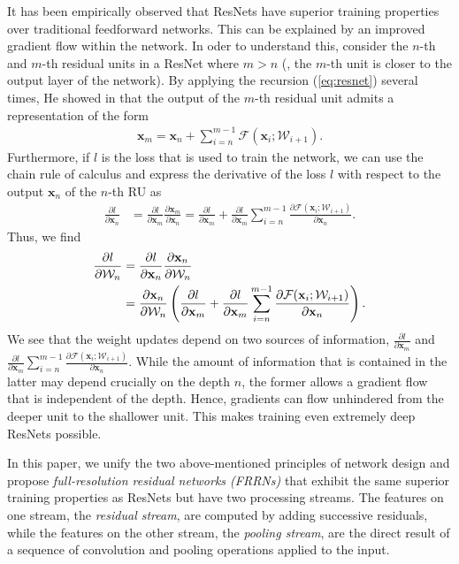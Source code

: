 \documentclass[10pt,twocolumn,letterpaper]{article}
\newcommand{\bx}{\mathbf{x}}
\newcommand{\PAR}[1]{\vskip4pt \noindent {\bf #1~}}
\begin{document}
It has been empirically observed that ResNets have superior training properties over traditional feedforward networks.
This can be explained by an improved gradient flow within the network.
In oder to understand this, consider the $n$-th and $m$-th residual units in a ResNet where $m > n$ (\ie, the $m$-th unit is closer to the output layer of the network).
By applying the recursion (\ref{eq:resnet}) several times, He \etal showed in  \cite{He16ECCV} that the output of the $m$-th residual unit admits a representation of the form
\begin{align}
	\bx_m = \bx_n + \sum_{i = n}^{m - 1} \mathcal{F}(\bx_i; \mathcal{W}_{i+1}).
\end{align}
Furthermore, if $l$ is the loss that is used to train the network, we can use the chain rule of calculus and express the derivative of the loss $l$ with respect to the output $\bx_n$ of the $n$-th RU as
\begin{align}
	\frac{\partial l}{\partial \bx_n} &= \frac{\partial l}{\partial \bx_m} \frac{\partial \bx_m}{\partial \bx_n} = \frac{\partial l}{\partial \bx_m} + \frac{\partial l}{\partial \bx_m} \sum_{i = n}^{m - 1} \frac{\partial \mathcal{F}(\bx_i; \mathcal{W}_{i+1})}{\partial \bx_n}.
\end{align}
Thus, we find
\begin{align}
	\frac{\partial l}{\partial \mathcal{W}_{n}} &= \frac{\partial l}{\partial \bx_n} \frac{\partial \bx_n}{\partial \mathcal{W}_{n}} \notag \\
	&= \frac{\partial \bx_n}{\partial \mathcal{W}_{n}} \left( \frac{\partial l}{\partial \bx_m} + \frac{\partial l}{\partial \bx_m} \sum_{i = n}^{m - 1} \frac{\partial \mathcal{F}(\bx_i; \mathcal{W}_{i+1})}{\partial \bx_n} \right).
\end{align}
We see that the weight updates depend on two sources of information, $\frac{\partial l}{\partial \bx_m}$ and $\frac{\partial l}{\partial \bx_m} \sum_{i = n}^{m - 1} \frac{\partial \mathcal{F}(\bx_i; \mathcal{W}_{i+1})}{\partial \bx_n}$.
While the amount of information that is contained in the latter may depend crucially on the depth $n$, the former allows a gradient flow that is independent of the depth.
Hence, gradients can flow unhindered from the deeper unit to the shallower unit.
This makes training even extremely deep ResNets possible.

\PAR{Full-Resolution Residual Networks (FRRNs).}
In this paper, we unify the two above-mentioned principles of network design and propose \emph{full-resolution residual networks (FRRNs)} that exhibit the same superior training properties as ResNets but have two processing streams.
The features on one stream, the \emph{residual stream}, are computed by adding successive residuals, while the features on the other stream, the \emph{pooling stream}, are the direct result of a sequence of convolution and pooling operations applied to the input.
\end{document}
